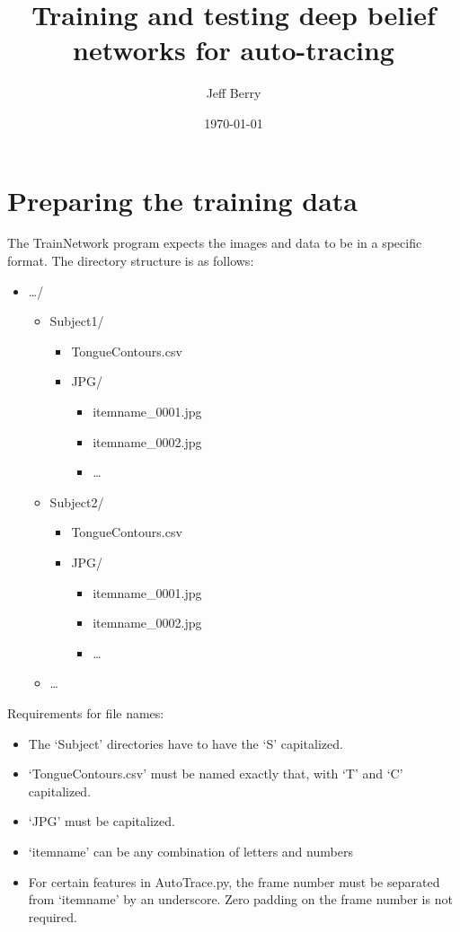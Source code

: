 \documentclass{article}
\title{Training and testing deep belief networks for auto-tracing}
\author{Jeff Berry}
\date{\today}
\begin{document}
\maketitle

\section{Preparing the training data}
The TrainNetwork program expects the images and data to be in a specific format. The directory structure is as follows:
\begin{itemize}
\item[] \ldots/
	\begin{itemize}
	\item[] Subject1/
		\begin{itemize}
		\item[] TongueContours.csv
		\item[] JPG/
			\begin{itemize}
			\item[] itemname\_0001.jpg
			\item[] itemname\_0002.jpg
			\item[] \ldots
			\end{itemize}
		\end{itemize}
	\item[] Subject2/
		\begin{itemize}
		\item[] TongueContours.csv
		\item[] JPG/
			\begin{itemize}
			\item[] itemname\_0001.jpg
			\item[] itemname\_0002.jpg
			\item[] \ldots
			\end{itemize}
		\end{itemize}
	\item[] \ldots	
	\end{itemize}
\end{itemize}	

\noindent Requirements for file names:
\begin{itemize}
	\item The `Subject' directories have to have the `S' capitalized. 
	\item `TongueContours.csv' must be named exactly that, with `T' and `C' capitalized.
	\item `JPG' must be capitalized.
	\item `itemname' can be any combination of letters and numbers
	\item For certain features in AutoTrace.py, the frame number must be separated from `itemname' by an underscore. Zero padding on the frame number is not required.
\end{itemize}
\end{document}
